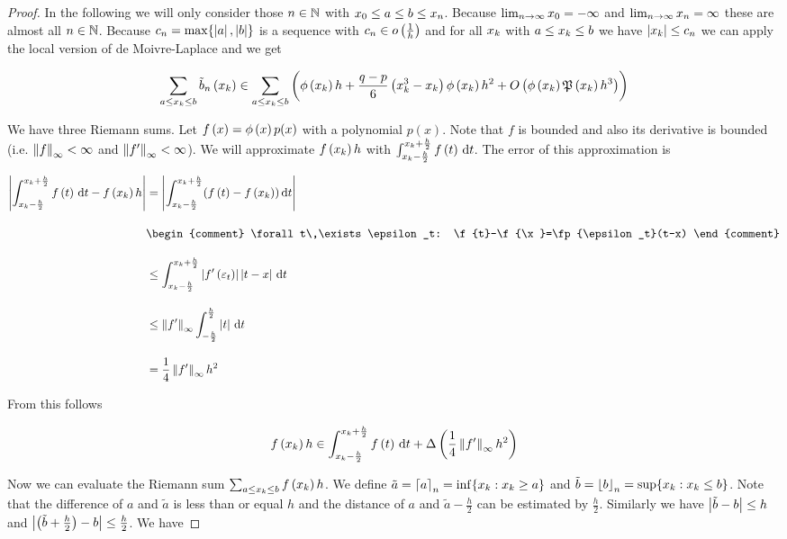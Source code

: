 \begin{proof}
  In the following we will only consider those $n\in\N$ with $\x[0] \le a \le b \le \x[n]$. Because $\lim_{n\to\infty} \x[0] = -\infty$ and $\lim_{n\to\infty} \x[n] = \infty$ these are almost all $n\in\N$. Because $c_n=\max\{\abs{a},\abs{b}\}$ is a sequence with $c_n\in\littleo{\frac 1h}$ and for all $\x$ with $a \le \x \le b$ we have $\abs{\x} \le c_n$ we can apply the local version of de Moivre-Laplace and we get

  \begin{align}
    \sum_{a \le \x \le b} \bb{\x} \in \sum_{a \le \x \le b} \left(\fphi{\x} h +\frac{q-p}6 \left(\x^3 - \x\right) \fphi{\x} h^2 + \bigo{\fphi{\x}\pol{\x}h^3}\right)
  \end{align}

  We have three Riemann sums. Let $\f{x}=\fphi{x}p(x)$ with a polynomial $p(x)$. Note that $f$ is bounded and also its derivative is bounded (i.e. $\snorm{f} < \infty$ and $\snorm{f'}<\infty$). We will approximate $\f{\x}h$ with $\int_{\x-\frac h2}^{\x+\frac h2} \f{t} \d{t}$. The error of this approximation is

  \begin{align}
    \abs{\int_{\x-\frac h2}^{\x+\frac h2} \f{t} \d{t} - \f{\x} h} &= \abs{\int_{\x-\frac h2}^{\x+\frac h2} (\f{t}-\f{\x}) \d{t}} \bnl
    &
    \begin{comment}
      \forall t\,\exists \epsilon_t: \f{t}-\f{\x}=\fp{\epsilon_t}(t-x)
    \end{comment} \bnl
    & \le \int_{\x-\frac h2}^{\x+\frac h2} \abs{\fp{\epsilon_t}} \abs{t-x} \d{t} \bnl
    & \le \snorm{f'} \int_{-\frac h2}^{\frac h2} \abs{t} \d{t} \bnl
    & = \frac 14 \snorm{f'} h^2
  \end{align}

  \noindent From this follows

  \begin{align}
    \f{\x} h \in \int_{\x-\frac h2}^{\x+\frac h2} \f{t} \d{t} + \bigabs{\frac 14 \snorm{f'} h^2}
  \end{align}

  Now we can evaluate the Riemann sum $\sum_{a \le \x \le b} \f{\x} h$. We define $\tilde a = \xup{a} = \inf \{ \x : \x \ge a \}$ and $\tilde b = \xdown{b} = \sup \{ \x : \x \le b \}$. Note that the difference of $a$ and $\tilde a$ is less than or equal $h$ and the distance of $a$ and $\tilde a - \frac h2$ can be estimated by $\frac h2$. Similarly we have $\abs{\tilde b-b} \le h$ and $\abs{\br{\tilde b+\frac h2}-b} \le \frac h2$. We have


\end{proof}
